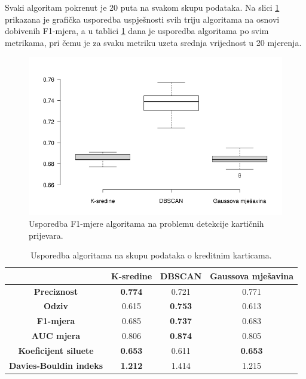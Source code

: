 \documentclass[utf8, diplomski, numeric]{fer}
\begin{document}
Svaki algoritam pokrenut je 20 puta na svakom skupu podataka. Na slici \ref{fig:credit-f1} prikazana je grafička usporedba uspješnosti svih triju algoritama na osnovi dobivenih F1-mjera, a u tablici \ref{tab:credit} dana je usporedba algoritama po svim metrikama, pri čemu je za svaku metriku uzeta srednja vrijednost u 20 mjerenja.

\begin{figure}[h!]
\includegraphics[width=1\textwidth]{images/credit-f1.png}
\centering
\caption{Usporedba F1-mjere algoritama na problemu detekcije kartičnih prijevara.}
\label{fig:credit-f1}
\end{figure}

\begin{table}[h!]
  \begin{center}
    \caption{Usporedba algoritama na skupu podataka o kreditnim karticama.}
    \label{tab:credit}
    \begin{tabular}{c|c|c|c} 
      & \textbf{K-sredine} & \textbf{DBSCAN}  & \textbf{Gaussova mješavina}\\
      \hline
      \textbf{Preciznost} & \textbf{0.774} & 0.721 & 0.771 \\
      \textbf{Odziv} & 0.615 & \textbf{0.753} & 0.613 \\
      \textbf{F1-mjera} & 0.685 & \textbf{0.737} & 0.683 \\
      \textbf{AUC mjera} & 0.806 & \textbf{0.874} & 0.805 \\
       \textbf{Koeficijent siluete} & \textbf{0.653} & 0.611 & \textbf{0.653} \\
       \textbf{Davies-Bouldin indeks} & \textbf{1.212} & 1.414 & 1.215 \\
     \end{tabular}
  \end{center}
\end{table}
\end{document}
